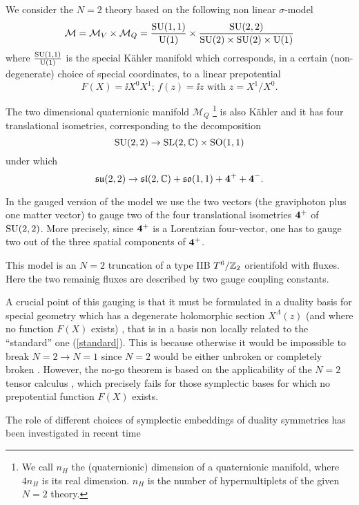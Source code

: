 \documentclass[a4paper,12pt]{article}
\begin{document}
We consider the $N=2$ theory based on the following non linear $\sigma$-model
$${\mathcal M} = {\mathcal M}_V \times {\mathcal M}_Q = \frac{\mathrm{SU}(1,1)}{\mathrm{U}(1)} \times \frac{\mathrm{SU}(2,2)}{\mathrm{SU}(2)\times \mathrm{SU}(2)\times
 \mathrm{U}(1)}$$
where $ \frac{\mathrm{SU}(1,1)}{\mathrm{U}(1)}$ is the special K\"ahler manifold which corresponds, in a certain (non-degenerate) choice
of special coordinates, to a linear prepotential 
\begin{equation}
F(X) = \ii X^0X^1; \, f(z) = \ii z \mbox{ with } z = X^1/X^0 .
\label{standard}
\end{equation}

The two dimensional quaternionic manifold ${\mathcal M}_Q$ 
\footnote{We call $n_H$ the (quaternionic) dimension of a quaternionic manifold, where $4n_H$ is its real dimension.
$n_H$ is the number of hypermultiplets of the given $N=2$ theory.}
 is also K\"ahler and it has four translational isometries, corresponding 
to the decomposition
\begin{equation}
 \mathrm{SU}(2,2) \to \mathrm{SL}(2,\mathbb{C}) \times\mathrm{SO}(1,1) \label{decomp}
\end{equation}
under which 
$$ \mathfrak{su}(2,2) \to \mathfrak{sl}(2,\mathbb{C}) +\mathfrak{so}(1,1) + {\bf 4}^++ {\bf 4}^-.$$ 

In the gauged version of the model we use the two vectors (the graviphoton plus one matter vector) to  gauge two of
the four  translational isometries ${\bf 4}^+$ of $\mathrm{SU}(2,2)$. More precisely, since ${\bf 4}^+$ is a Lorentzian four-vector, one
has to gauge two out of the three spatial components of ${\bf 4}^+$.

This model is an $N=2$ truncation \cite{adfl2,adfl3} of a type IIB 
$T^6/\mathbb{Z}_2$ orientifold with fluxes. 
Here the two remainig fluxes are described by two gauge coupling constants.


A crucial point of this gauging is that it must be formulated in a duality basis \cite{gz}
 for special geometry which has a degenerate holomorphic
section $X^\Lambda(z)$ (and where no function $F(X)$ exists) \cite{cdfv,fgp}, 
that is in a basis non locally related to the ``standard'' one (\ref{standard}).
This is because otherwise it would be impossible to break $N=2 \to N=1$ since $N=2$
would be either unbroken or completely broken \cite{cgp1,cgp2}.
However, the no-go theorem \cite{cgp2} is based on the applicability of the $N=2$ tensor calculus \cite{dlv}, 
which precisely fails for those symplectic
bases for which no prepotential function $F(X)$ exists.

The role of different choices of symplectic embeddings of duality symmetries has been investigated in recent time 
\cite{adfl2,adfl3,hull}
\end{document}
